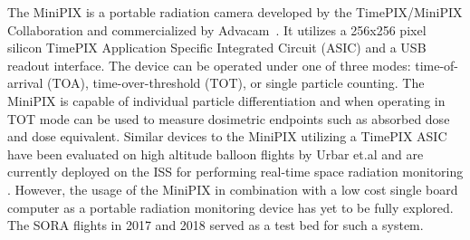 The MiniPIX is a portable radiation camera developed by the TimePIX/MiniPIX Collaboration and commercialized by Advacam~\cite{advacam}.  It utilizes a 256x256 pixel silicon TimePIX Application Specific Integrated Circuit (ASIC) and a USB readout interface. The device can be operated under one of three modes: time-of-arrival (TOA), time-over-threshold (TOT), or single particle counting. 
%
%
%
The MiniPIX is capable of individual particle differentiation and when operating in TOT mode can be used to measure dosimetric endpoints such as absorbed dose and dose equivalent. Similar devices to the MiniPIX utilizing a TimePIX ASIC have been evaluated on high altitude balloon flights by Urbar et.al \cite{bexus} and are currently deployed on the ISS for performing real-time space radiation monitoring \cite{timepixiss}. However, the usage of the MiniPIX in combination with a low cost single board computer as a portable radiation monitoring device has yet to be fully explored. The SORA flights in 2017 and 2018 served as a test bed for such a system.


